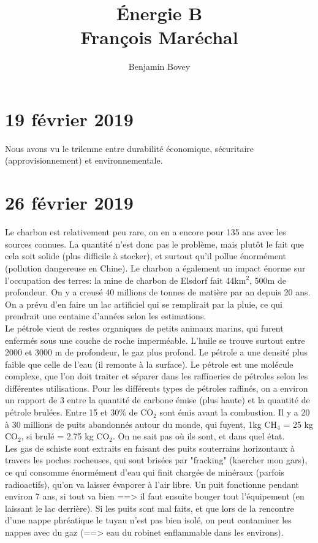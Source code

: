 \documentclass{article}
\title{Énergie B \\ François Maréchal}
\author{Benjamin Bovey}
\begin{document}
\maketitle


\section{19 février 2019}
Nous avons vu le trilemne entre durabilité économique, sécuritaire (approvisionnement) et environnementale.

\section{26 février 2019}
Le charbon est relativement peu rare, on en a encore pour 135 ans avec les sources connues. La quantité n'est donc pas le problème, mais plutôt le fait que cela soit solide (plus difficile à stocker), et surtout qu'il pollue énormément (pollution dangereuse en Chine). Le charbon a également un impact énorme sur l'occupation des terres: la mine de charbon de Elsdorf fait 44km$^2$, 500m de profondeur. On y a creusé 40 millions de tonnes de matière par an depuis 20 ans. On a prévu d'en faire un lac artificiel qui se remplirait par la pluie, ce qui prendrait une centaine d'années selon les estimations. \\

 Le pétrole vient de restes organiques de petits animaux marins, qui furent enfermés sous une couche de roche imperméable. L'huile se trouve surtout entre 2000 et 3000 m de profondeur, le gaz plus profond. Le pétrole a une densité plus faible que celle de l'eau (il remonte à la surface). Le pétrole est une molécule complexe, que l'on doit traiter et séparer dans les raffineries de pétroles selon les différentes utilisations. Pour les différents types de pétroles raffinés, on a environ un rapport de 3 entre la quantité de carbone émise (plus haute) et la quantité de pétrole brulées. Entre 15 et 30\% de CO$_2$ sont émis avant la combustion. Il y a 20 à 30 millions de puits abandonnés autour du monde, qui fuyent, 1kg CH$_4$ = 25 kg CO$_2$, si brulé = 2.75 kg CO$_2$. On ne sait pas où ils sont, et dans quel état. \\

 Les gas de schiste sont extraits en faisant des puits souterrains horizontaux à travers les poches rocheuses, qui sont brisées par "fracking" (kaercher mon gars), ce qui consomme énormément d'eau qui finit chargée de minéraux (parfois radioactifs), qu'on va laisser évaporer à l'air libre. Un puit fonctionne pendant environ 7 ans, si tout va bien ==> il faut ensuite bouger tout l'équipement (en laissant le lac derrière). Si les puits sont mal faits, et que lors de la rencontre d'une nappe phréatique le tuyau n'est pas bien isolé, on peut contaminer les nappes avec du gaz (==> eau du robinet enflammable dans les environs). \\
\end{document}

